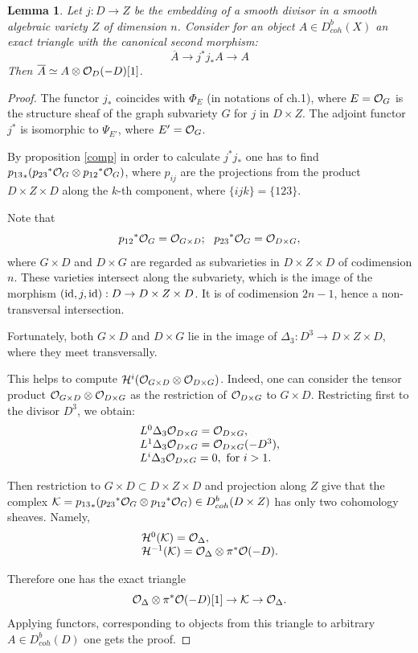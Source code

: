 \documentclass[12pt]{article}
\newtheorem{lemma}[theorem]{Lemma}
\def\db#1{ D^b_{coh}({#1})}
\def\o#1{{\cal O}_{#1}}
\begin{document}
\begin{lemma}\label{combar}
Let $j:D\to Z$ be the embedding of a smooth divisor in a smooth algebraic variety $Z$ of dimension $n$. Consider for an object $A\in \db{X}$ an exact triangle with the canonical second morphism:
$$
\overline A\to j^{*}j_{*}A\to A
$$
Then $\overline A\simeq A\otimes {\cal O}_D(-D)[1]$.
\end{lemma}
\begin{proof}
The functor $j_{*}$ coincides with $\Phi _E$ (in notations of ch.1), where $E={\o G}$ is the structure sheaf of the graph subvariety $G$ for $j$ in $D\times Z$. The adjoint functor $j^{*}$ is isomorphic to $\Psi _{E'}$, where  $E'={\o G}$.

By proposition \ref{comp} in order to calculate $j^{*}j_{*}$ one has to find ${p_{13}}_*({p_{23}}^*{\o G}\otimes {p_{12}}^*{\o G})$, where $p_{ij}$ are the projections from the product $D\times Z\times D$ along the $k$-th component, where $\{ ijk\} =\{ 123\}$.

Note that
$$
{p_{12}}^*{\o G}={\o {G\times D}};\ \ {p_{23}}^*{\o G}={\o {D\times G}},
$$
where ${G\times D}$ and ${D\times G}$ are regarded as subvarieties in $D\times Z\times D$ of codimension $n$. These varieties intersect along the subvariety, which is the image of the morphism $({\rm id},j,{\rm id}):D\to D\times Z\times D$. It is of codimension $2n-1$, hence a non-transversal intersection.

Fortunately, both ${G\times D}$ and ${D\times G}$ lie in the image of $\Delta_3:D^3\to D\times Z\times D$, where they meet transversally.

This helps to compute ${\cal H}^i({\o {G\times D}}\otimes {\o {D\times G}})$. Indeed, one can consider the tensor product ${\o {G\times D}}\otimes {\o {D\times G}}$ as the restriction of ${\o {D\times G}}$ to ${G\times D}$. Restricting first to the divisor $D^3$, we obtain:
$$
\begin{array}{l}
L^0\Delta_3{\o {D\times G}}={\o {D\times G}},\\ L^1\Delta_3{\o {D\times G}}={\o {D\times G}}(-D^3),\\
L^i\Delta_3{\o {D\times G}}=0, \ {\rm for}\  i>1.
\end{array}
$$

Then restriction to  ${G\times D}\subset D\times Z\times D$ and projection along $Z$ give that the complex ${\cal K}={p_{13}}_*({p_{23}}^*{\o G}\otimes {p_{12}}^*{\o G})\in {\db {D\times Z}}$ has only two cohomology sheaves. Namely,
$$
\begin{array}{l}
{\cal H}^0({\cal K})={\o {\Delta}},\\
{\cal H}^{-1}({\cal K})={\o {\Delta }}\otimes \pi ^*{\cal O}(-D).
\end{array}
$$

Therefore one has the exact triangle
$$
{\o {\Delta }}\otimes \pi ^*{\cal O}(-D)[1]\to {\cal K}\to {\o {\Delta }}.
$$
Applying functors, corresponding to objects from this triangle to arbitrary $A\in {\db  D}$ one gets the proof.
\end{proof}
\end{document}
